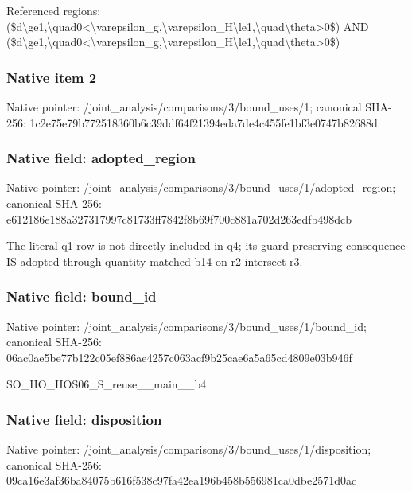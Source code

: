 \documentclass[10pt,a4paper]{article}
\begin{document}
\begingroup\raggedright\sloppy Referenced regions:\allowbreak{} (\$d\textbackslash{}ge1,\allowbreak{}\textbackslash{}quad0<\textbackslash{}varepsilon\_\allowbreak{}g,\allowbreak{}\textbackslash{}varepsilon\_\allowbreak{}H\textbackslash{}le1,\allowbreak{}\textbackslash{}quad\textbackslash{}theta>0\$) AND (\$d\textbackslash{}ge1,\allowbreak{}\textbackslash{}quad0<\textbackslash{}varepsilon\_\allowbreak{}g,\allowbreak{}\textbackslash{}varepsilon\_\allowbreak{}H\textbackslash{}le1,\allowbreak{}\textbackslash{}quad\textbackslash{}theta>0\$)\par\endgroup

\subsubsection{Native item 2}
Native pointer: /joint\_\allowbreak{}analysis/comparisons/3/bound\_\allowbreak{}uses/1; canonical SHA-256: 1c2e75e79b772518360b6c39ddf64f21394eda7de4c455fe1bf3e0747b82688d

\subsubsection{Native field: adopted\_\allowbreak{}region}
Native pointer: /joint\_\allowbreak{}analysis/comparisons/3/bound\_\allowbreak{}uses/1/adopted\_\allowbreak{}region; canonical SHA-256: e612186e188a327317997c81733ff7842f8b69f700c881a702d263edfb498dcb

\begingroup\raggedright\sloppy The literal q1 row is not directly included in q4;\allowbreak{} its guard-preserving consequence IS adopted through quantity-matched b14 on r2 intersect r3.\par\endgroup

\subsubsection{Native field: bound\_\allowbreak{}id}
Native pointer: /joint\_\allowbreak{}analysis/comparisons/3/bound\_\allowbreak{}uses/1/bound\_\allowbreak{}id; canonical SHA-256: 06ac0ae5be77b122c05ef886ae4257c063acf9b25cae6a5a65cd4809e03b946f

\begingroup\raggedright\sloppy SO\_\allowbreak{}HO\_\allowbreak{}HOS06\_\allowbreak{}S\_\allowbreak{}reuse\_\allowbreak{}\_\allowbreak{}main\_\allowbreak{}\_\allowbreak{}b4\par\endgroup

\subsubsection{Native field: disposition}
Native pointer: /joint\_\allowbreak{}analysis/comparisons/3/bound\_\allowbreak{}uses/1/disposition; canonical SHA-256: 09ca16e3af36ba84075b616f538c97fa42ea196b458b556981ca0dbe2571d0ac
\end{document}
